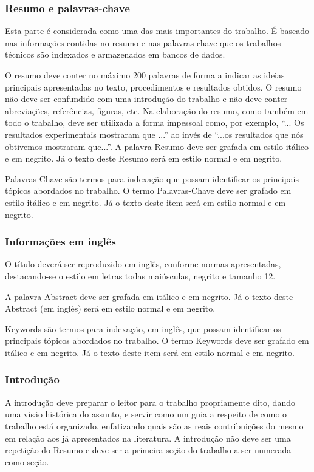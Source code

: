 \subsubsection{Resumo e palavras-chave} 
Esta parte é considerada como uma das mais importantes do trabalho. É baseado nas informações contidas no resumo e nas palavras-chave que os trabalhos técnicos são indexados e armazenados em bancos de dados.

O resumo deve conter no máximo 200 palavras de forma a indicar as ideias principais apresentadas no texto, procedimentos e resultados obtidos. O resumo não deve ser confundido com uma introdução do trabalho e não deve conter abreviações, referências, figuras, etc. Na elaboração do resumo, como também em todo o trabalho, deve ser utilizada a forma impessoal como, por exemplo, ``... Os resultados experimentais mostraram que ...'' ao invés de ``...os resultados que nós obtivemos mostraram que...''. A palavra Resumo deve ser grafada em estilo itálico e em negrito. Já o texto deste Resumo será em estilo normal e em negrito.

Palavras-Chave são termos para indexação que possam identificar os principais tópicos abordados no trabalho. O termo Palavras-Chave deve ser grafado em estilo itálico e em negrito. Já o texto deste item será em estilo normal e em negrito.

\subsubsection{Informações em inglês} 
O título deverá ser reproduzido em inglês, conforme normas apresentadas, destacando-se o estilo em letras todas maiúsculas, negrito e tamanho 12.

A palavra Abstract deve ser grafada em itálico e em negrito. Já o texto deste Abstract (em inglês) será em estilo normal e em negrito.

Keywords são termos para indexação, em inglês, que possam identificar os principais tópicos abordados no trabalho. O termo Keywords deve ser grafado em itálico e em negrito. Já o texto deste item será em estilo normal e em negrito.

\subsubsection{Introdução} 
A introdução deve preparar o leitor para o trabalho propriamente dito, dando uma visão histórica do assunto, e servir como um guia a respeito de como o trabalho está organizado, enfatizando quais são as reais contribuições do mesmo em relação aos já apresentados na literatura. A introdução não deve ser uma repetição do Resumo e deve ser a primeira seção do trabalho a ser numerada como seção.


